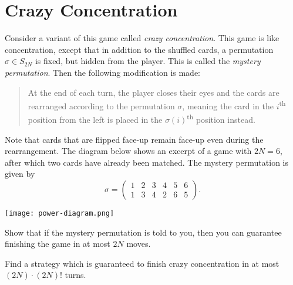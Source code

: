 \documentclass[10pt]{article}
\newif\ifpaper
\begin{document}
\section{Crazy Concentration}
Consider a variant of this game called \emph{crazy concentration}.
This game is like concentration, except that in addition to the shuffled cards,
a permutation $\sigma \in S_{2N}$ is fixed, but hidden from the player.
This is called the \emph{mystery permutation}.
Then the following modification is made:
\begin{quote}
    At the end of each turn, the player closes their eyes
    and the cards are rearranged according to the permutation $\sigma$,
    meaning the card in the $i$\textsuperscript{th} position from the left
    is placed in the $\sigma(i)$\textsuperscript{th} position instead.
\end{quote}
Note that cards that are flipped face-up remain face-up
even during the rearrangement.
The diagram below shows an excerpt of a game with $2N = 6$,
after which two cards have already been matched.
The mystery permutation is given by
\[ \sigma = 
    \begin{pmatrix}
        1 & 2 & 3 & 4 & 5 & 6 \\
        1 & 3 & 4 & 2 & 6 & 5
    \end{pmatrix}.
\]
\begin{center}
\texttt{[image: power-diagram.png]}
\end{center}

\begin{problem}
    [4 points]
    Show that if the mystery permutation is told to you,
    then you can guarantee finishing the game in at most $2N$ moves.
\end{problem}

\ifpaper
\begin{tcolorbox}
On turn $t$ for $1\le t\le N$, flip over cards $\{\sigma^t(2t-1),\sigma^t(2t)\}$. Each time we do this, we discover what cards were originally located in positions $\{2t-1,2t\}$. Therefore, after doing this, we know exactly how the deck was originally shuffled. Thus, on the $t$th turn for $N+1\le t\le2N$, we find a new matching pair $i,j$ in the original shuffling of the deck and flip them over by choosing cards $\{\sigma^t(i),\sigma^t(j)\}$.
\end{tcolorbox}
\fi

\begin{problem}
    [3 points]
    Find a strategy which is guaranteed to finish
    crazy concentration in at most $(2N) \cdot (2N)!$ turns.
\end{problem}
\end{document}
